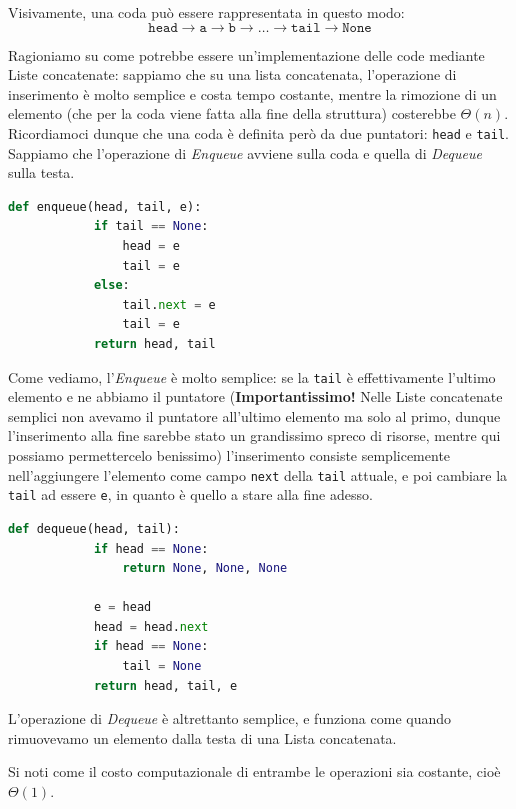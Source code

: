 \documentclass[12pt]{report}
\begin{document}
    Visivamente, una coda può essere rappresentata in questo modo:
    \[
    \texttt{head} \rightarrow \texttt{a} \rightarrow \texttt{b} \rightarrow \dots \rightarrow \texttt{tail} \rightarrow \texttt{None}
    \]
    
    Ragioniamo su come potrebbe essere un'implementazione delle code mediante Liste concatenate: sappiamo che su una lista concatenata, l'operazione di inserimento è molto semplice e costa tempo costante, mentre la rimozione di un elemento (che per la coda viene fatta alla fine della struttura) costerebbe $\Theta(n)$. Ricordiamoci dunque che una coda è definita però da due puntatori: \texttt{head} e \texttt{tail}. Sappiamo che l'operazione di \textit{Enqueue} avviene sulla coda e quella di \textit{Dequeue} sulla testa. 
    
    \newpage
    \begin{lstlisting}[language=Python, caption={Operazione di Enqueue (Inserimento) in una coda}]
    	def enqueue(head, tail, e):
    		if tail == None:
    			head = e
    			tail = e
    		else:
    			tail.next = e
    			tail = e
    		return head, tail
    \end{lstlisting}
    
    Come vediamo, l'\textit{Enqueue} è molto semplice: se la \texttt{tail} è effettivamente l'ultimo elemento e ne abbiamo il puntatore (\textbf{Importantissimo!} Nelle Liste concatenate semplici non avevamo il puntatore all'ultimo elemento ma solo al primo, dunque l'inserimento alla fine sarebbe stato un grandissimo spreco di risorse, mentre qui possiamo permettercelo benissimo) l'inserimento consiste semplicemente nell'aggiungere l'elemento come campo \texttt{next} della \texttt{tail} attuale, e poi cambiare la \texttt{tail} ad essere \texttt{e}, in quanto è quello a stare alla fine adesso.
    
    \begin{lstlisting}[language=Python, caption={Operazione di Dequeue (Estrazione) da una coda}]
    	def dequeue(head, tail):
    		if head == None:
    			return None, None, None
    		
    		e = head
    		head = head.next
    		if head == None:
    			tail = None
    		return head, tail, e
    \end{lstlisting}
    
    L'operazione di \textit{Dequeue} è altrettanto semplice, e funziona come quando rimuovevamo un elemento dalla testa di una Lista concatenata.
    
    Si noti come il costo computazionale di entrambe le operazioni sia costante, cioè $\Theta(1)$.
    
\end{document}
